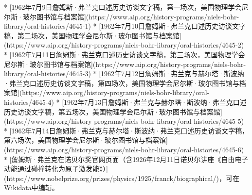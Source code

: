* [1962年7月9日詹姆斯·弗兰克口述历史访谈文字稿，第一场次，美国物理学会尼尔斯·玻尔图书馆与档案馆](https://www.aip.org/history-programs/niels-bohr-library/oral-histories/4645-1)
* [1962年7月10日詹姆斯·弗兰克口述历史访谈文字稿，第二场次，美国物理学会尼尔斯·玻尔图书馆与档案馆](https://www.aip.org/history-programs/niels-bohr-library/oral-histories/4645-2)
* [1962年7月11日詹姆斯·弗兰克口述历史访谈文字稿，第三场次，美国物理学会尼尔斯·玻尔图书馆与档案馆](https://www.aip.org/history-programs/niels-bohr-library/oral-histories/4645-3)
* [1962年7月12日詹姆斯·弗兰克与赫尔塔·斯波纳·弗兰克口述历史访谈文字稿，第四场次，美国物理学会尼尔斯·玻尔图书馆与档案馆](https://www.aip.org/history-programs/niels-bohr-library/oral-histories/4645-4)
* [1962年7月13日詹姆斯·弗兰克与赫尔塔·斯波纳·弗兰克口述历史访谈文字稿，第五场次，美国物理学会尼尔斯·玻尔图书馆与档案馆](https://www.aip.org/history-programs/niels-bohr-library/oral-histories/4645-5)
* [1962年7月14日詹姆斯·弗兰克与赫尔塔·斯波纳·弗兰克口述历史访谈文字稿，第六场次，美国物理学会尼尔斯·玻尔图书馆与档案馆](https://www.aip.org/history-programs/niels-bohr-library/oral-histories/4645-6)
* [詹姆斯·弗兰克在诺贝尔奖官网页面（含1926年12月11日诺贝尔讲座《自由电子动能通过碰撞转化为原子激发能》）](https://www.nobelprize.org/prizes/physics/1925/franck/biographical/)，可在Wikidata中编辑。
